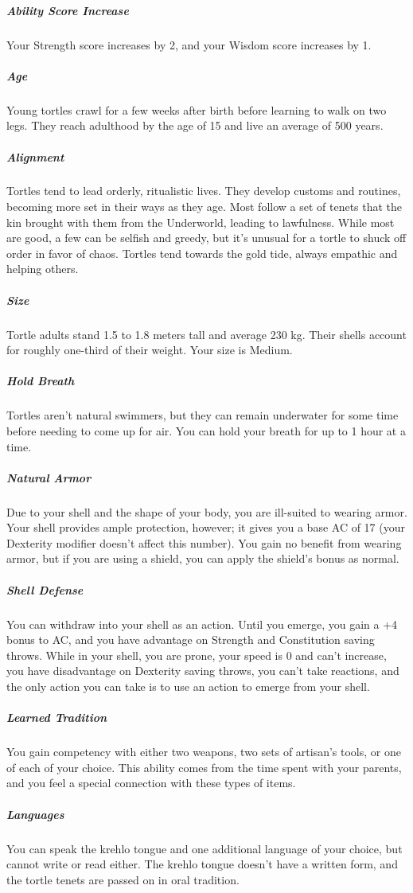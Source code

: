 \subparagraph{Ability Score Increase} Your Strength score increases by 2, and your Wisdom score increases by 1.

\subparagraph{Age} Young tortles crawl for a few weeks after birth before learning to walk on two legs.
They reach adulthood by the age of 15 and live an average of 500 years.

\subparagraph{Alignment} Tortles tend to lead orderly, ritualistic lives.
They develop customs and routines, becoming more set in their ways as they age.
Most follow a set of tenets that the kin brought with them from the Underworld, leading to lawfulness.
While most are good, a few can be selfish and greedy, but it's unusual for a tortle to shuck off order in favor of chaos.
Tortles tend towards the gold tide, always empathic and helping others.

\subparagraph{Size} Tortle adults stand 1.5 to 1.8 meters tall and average 230 kg.
Their shells account for roughly one-third of their weight.
Your size is Medium.

\subparagraph{Hold Breath} Tortles aren't natural swimmers, but they can remain underwater for some time before needing to come up for air.
You can hold your breath for up to 1 hour at a time.

\subparagraph{Natural Armor} Due to your shell and the shape of your body, you are ill-suited to wearing armor.
Your shell provides ample protection, however; it gives you a base AC of 17 (your Dexterity modifier doesn't affect this number).
You gain no benefit from wearing armor, but if you are using a shield, you can apply the shield's bonus as normal.

\subparagraph{Shell Defense} You can withdraw into your shell as an action.
Until you emerge, you gain a +4 bonus to AC, and you have advantage on Strength and Constitution saving throws.
While in your shell, you are prone, your speed is 0 and can't increase, you have disadvantage on Dexterity saving throws, you can't take reactions, and the only action you can take is to use an action to emerge from your shell.


\subparagraph{Learned Tradition} You gain competency with either two weapons, two sets of artisan's tools, or one of each of your choice.
This ability comes from the time spent with your parents, and you feel a special connection with these types of items.

\subparagraph{Languages} You can speak the krehlo tongue and one additional language of your choice, but cannot write or read either.
The krehlo tongue doesn't have a written form, and the tortle tenets are passed on in oral tradition.



\newpage
